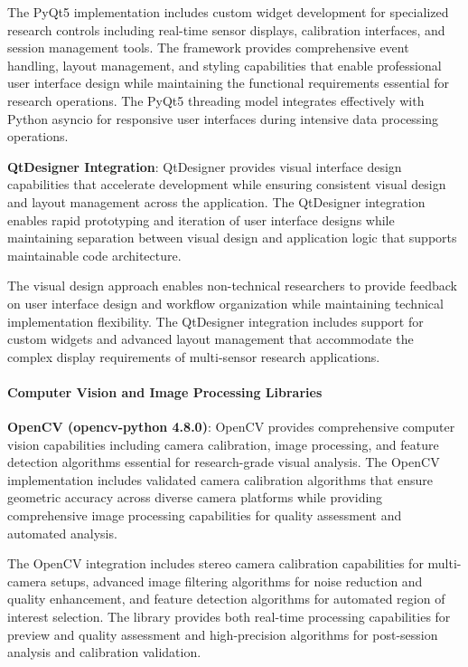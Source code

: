 \documentclass[11pt,a4paper]{article}
\begin{document}
The PyQt5 implementation includes custom widget development for specialized research controls including real-time sensor
displays, calibration interfaces, and session management tools. The framework provides comprehensive event handling,
layout management, and styling capabilities that enable professional user interface design while maintaining the
functional requirements essential for research operations. The PyQt5 threading model integrates effectively with Python
asyncio for responsive user interfaces during intensive data processing operations.

\textbf{QtDesigner Integration}: QtDesigner provides visual interface design capabilities that accelerate development while
ensuring consistent visual design and layout management across the application. The QtDesigner integration enables rapid
prototyping and iteration of user interface designs while maintaining separation between visual design and application
logic that supports maintainable code architecture.

The visual design approach enables non-technical researchers to provide feedback on user interface design and workflow
organization while maintaining technical implementation flexibility. The QtDesigner integration includes support for
custom widgets and advanced layout management that accommodate the complex display requirements of multi-sensor research
applications.

\paragraph{Computer Vision and Image Processing Libraries}

\textbf{OpenCV (opencv-python 4.8.0)}: OpenCV provides comprehensive computer vision capabilities including camera
calibration, image processing, and feature detection algorithms essential for research-grade visual analysis. The OpenCV
implementation includes validated camera calibration algorithms that ensure geometric accuracy across diverse camera
platforms while providing comprehensive image processing capabilities for quality assessment and automated analysis.

The OpenCV integration includes stereo camera calibration capabilities for multi-camera setups, advanced image filtering
algorithms for noise reduction and quality enhancement, and feature detection algorithms for automated region of
interest selection. The library provides both real-time processing capabilities for preview and quality assessment and
high-precision algorithms for post-session analysis and calibration validation.
\end{document}
